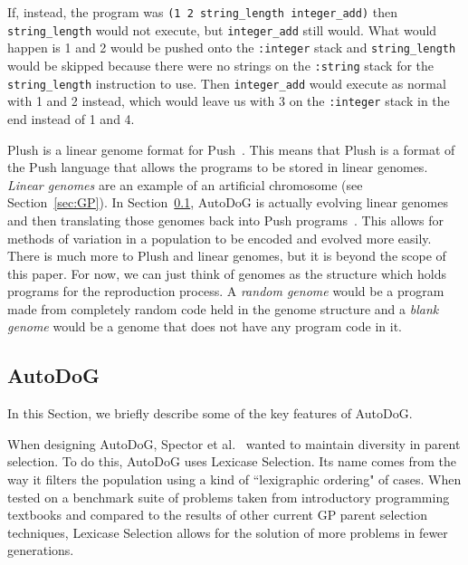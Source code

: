 \documentclass{sig-alternate}
\begin{document}
If, instead, the program was \texttt{(1 2 string\_length integer\_add)} then \texttt{string\_length} would not execute, but \texttt{integer\_add} still would. What would happen is 1 and 2 would be pushed onto the \texttt{:integer} stack and \texttt{string\_length} would be skipped because there were no strings on the \texttt{:string} stack for the \texttt{string\_length} instruction to use. Then \texttt{integer\_add} would execute as normal with 1 and 2 instead, which would leave us with 3 on the \texttt{:integer} stack in the end instead of 1 and 4.

Plush is a linear genome format for Push~\cite{spector:2016}. This means that Plush is a format of the Push language that allows the programs to be stored in linear genomes. \textit{Linear genomes} are an example of an artificial chromosome (see Section~\ref{sec:GP}). In Section~\ref{sec:autodog}, AutoDoG is actually evolving linear genomes and then translating those genomes back into Push programs~\cite{spector:2016}. This allows for methods of variation in a population to be encoded and evolved more easily. There is much more to Plush and linear genomes, but it is beyond the scope of this paper. For now, we can just think of genomes as the structure which holds programs for the reproduction process. A \textit{random genome} would be a program made from completely random code held in the genome structure and a \textit{blank genome} would be a genome that does not have any program code in it.

\subsection{AutoDoG}
\label{sec:autodog}
In this Section, we briefly describe some of the key features of AutoDoG.

When designing AutoDoG, Spector et al.~\cite{spector:2016} wanted to maintain diversity in parent selection. To do this, AutoDoG uses Lexicase Selection. Its name comes from the way it filters the population using a kind of ``lexigraphic ordering" of cases. When tested on a benchmark suite of problems taken from introductory programming textbooks and compared to the results of other current GP parent selection techniques, Lexicase Selection allows for the solution of more problems in fewer generations.
\end{document}
